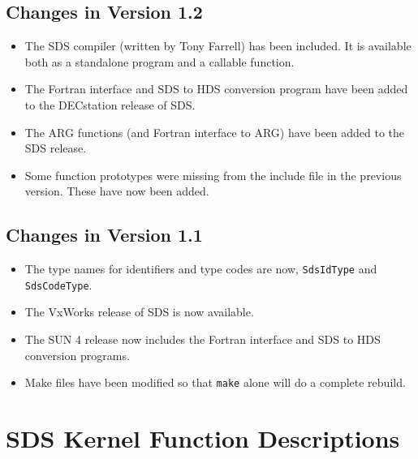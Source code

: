 \subsection{Changes in Version 1.2}

\begin{itemize}

\item The SDS compiler (written by Tony Farrell) has been included. It is
available both as a standalone program and a callable function.

\item The Fortran interface and SDS to HDS conversion program have been added
to the DECstation release of SDS.

\item The ARG functions (and Fortran interface to ARG) have been added to
the SDS release.

\item Some function prototypes were missing from the include file in the
previous version. These have now been added.

\end{itemize}

\subsection{Changes in Version 1.1}

\begin{itemize}

\item The type names for identifiers and type codes are now, \verb$SdsIdType$
and \verb$SdsCodeType$.

\item The VxWorks release of SDS is now available.

\item The SUN 4 release now includes the Fortran interface and SDS to HDS
conversion programs.

\item Make files have been modified so that \verb$make$ alone will do a
complete rebuild.

\end{itemize}

\newpage
\appendix
\section{SDS Kernel Function Descriptions}
\label{SDS-kernel-functions}

